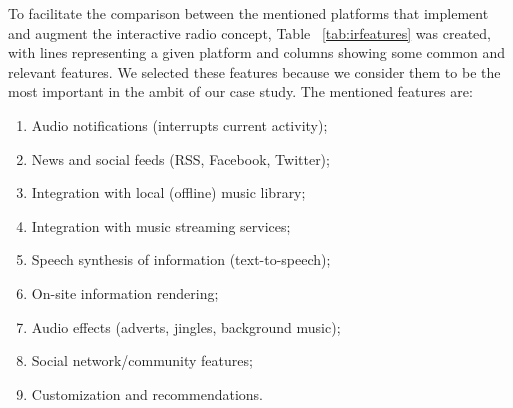 To facilitate the comparison between the mentioned platforms that implement and augment the interactive radio concept, Table ~\ref{tab:irfeatures} was created, with lines representing a given platform and columns showing some common and relevant features. We selected these features because we consider them to be the most important in the ambit of our case study. The mentioned features are:

\begin{enumerate}[label=(\alph*)]
	\item Audio notifications (interrupts current activity);
	\item News and social feeds (RSS, Facebook, Twitter);
	\item Integration with local (offline) music library;
	\item Integration with music streaming services;
	\item Speech synthesis of information (text-to-speech);
	\item On-site information rendering;
	\item Audio effects (adverts, jingles, background music);
	\item Social network/community features;
	\item Customization and recommendations.
\end{enumerate}


